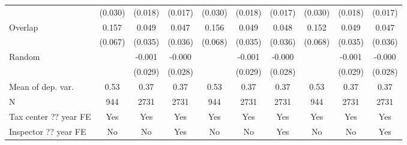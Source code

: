 {\begin{tabular}{l*{9}{c}}
                &  (0.030)         &  (0.018)         &  (0.017)         &  (0.030)         &  (0.018)         &  (0.017)         &  (0.030)         &  (0.018)         &  (0.017)         \\
\addlinespace
Overlap         &    0.157\sym{**} &    0.049         &    0.047         &    0.156\sym{**} &    0.049         &    0.048         &    0.152\sym{**} &    0.049         &    0.047         \\
                &  (0.067)         &  (0.035)         &  (0.036)         &  (0.068)         &  (0.035)         &  (0.036)         &  (0.068)         &  (0.035)         &  (0.036)         \\
\addlinespace
Random          &                  &   -0.001         &   -0.000         &                  &   -0.001         &   -0.000         &                  &   -0.001         &   -0.000         \\
                &                  &  (0.029)         &  (0.028)         &                  &  (0.029)         &  (0.028)         &                  &  (0.029)         &  (0.028)         \\
\midrule
Mean of dep. var.&     0.53         &     0.37         &     0.37         &     0.53         &     0.37         &     0.37         &     0.53         &     0.37         &     0.37         \\
N               &      944         &     2731         &     2731         &      944         &     2731         &     2731         &      944         &     2731         &     2731         \\
Tax center ?? year FE&      Yes         &      Yes         &      Yes         &      Yes         &      Yes         &      Yes         &      Yes         &      Yes         &      Yes         \\
Inspector ?? year FE&       No         &       No         &      Yes         &       No         &       No         &      Yes         &       No         &       No         &      Yes         \\
\bottomrule
\end{tabular}
}
